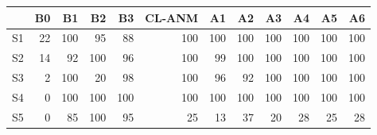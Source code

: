\begin{tabular}{lrrrrrrrrrrr}
\toprule
 & B0 & B1 & B2 & B3 & CL-ANM & A1 & A2 & A3 & A4 & A5 & A6 \\
\midrule
S1 & 22 & 100 & 95 & 88 & 100 & 100 & 100 & 100 & 100 & 100 & 100 \\
S2 & 14 & 92 & 100 & 96 & 100 & 99 & 100 & 100 & 100 & 100 & 100 \\
S3 & 2 & 100 & 20 & 98 & 100 & 96 & 92 & 100 & 100 & 100 & 100 \\
S4 & 0 & 100 & 100 & 100 & 100 & 100 & 100 & 100 & 100 & 100 & 100 \\
S5 & 0 & 85 & 100 & 95 & 25 & 13 & 37 & 20 & 28 & 25 & 28 \\
\bottomrule
\end{tabular}
